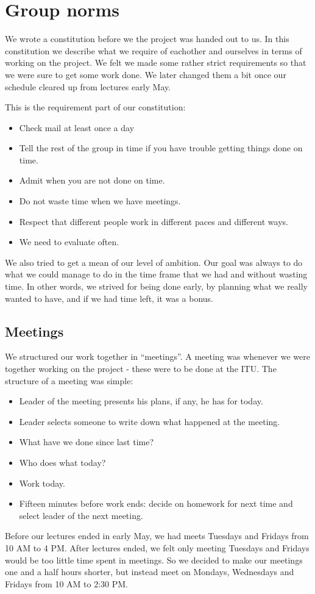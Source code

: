 \chapter{Group norms}
\label{GN}
We wrote a constitution before we the project was handed out to us. In this
constitution we describe what we require of eachother and ourselves in terms of
working on the project. We felt we made some rather strict requirements so that
we were sure to get some work done. We later changed
them a bit once our schedule cleared up from lectures early May.

This is the requirement part of our constitution:
\begin{itemize}
  \item Check mail at least once a day
  \item Tell the rest of the group in time if you have trouble getting things done on
  time.
  \item Admit when you are not done on time.
  \item Do not waste time when we have meetings.
  \item Respect that different people work in different paces and different
  ways.
  \item We need to evaluate often.
\end{itemize}

We also tried to get a mean of our level of ambition. Our goal was always to do
what we could manage to do in the time frame that we had and without wasting
time. In other words, we strived for being done early, by planning what we really 
wanted to have, and if we had time left, it was a bonus.

\section{Meetings}
\label{GN-M}
We structured our work together in ``meetings''. A meeting was whenever we were
together working on the project - these were to be done at the ITU. The
structure of a meeting was simple:
\begin{itemize}
  \item Leader of the meeting presents his plans, if any, he has for today. 
  \item Leader selects someone to write down what happened at the meeting.
  \item What have we done since last time?
  \item Who does what today?
  \item Work today.
  \item Fifteen minutes before work ends: decide on homework for next time and
  select leader of the next meeting.
\end{itemize}
Before our lectures ended in early May, we had meets Tuesdays and Fridays from
10 AM to 4 PM. After lectures ended, we felt only meeting Tuesdays and Fridays
would be too little time spent in meetings. So we decided to make our meetings
one and a half hours shorter, but instead meet on Mondays, Wednesdays and
Fridays from 10 AM to 2:30 PM.